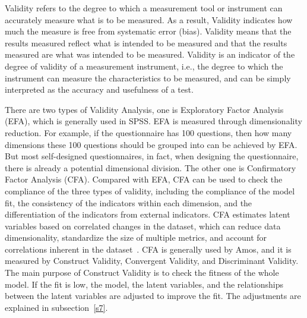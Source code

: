Validity refers to the degree to which a measurement tool or instrument can accurately measure what is to be measured. As a result, Validity indicates how much the measure is free from systematic error (bias). Validity means that the results measured reflect what is intended to be measured and that the results measured are what was intended to be measured. Validity is an indicator of the degree of validity of a measurement instrument, i.e., the degree to which the instrument can measure the characteristics to be measured, and can be simply interpreted as the accuracy and usefulness of a test. 

There are two types of Validity Analysis, one is Exploratory Factor Analysis (EFA), which is generally used in SPSS. EFA is measured through dimensionality reduction. For example, if the questionnaire has 100 questions, then how many dimensions these 100 questions should be grouped into can be achieved by EFA. But most self-designed questionnaires, in fact, when designing the questionnaire, there is already a potential dimensional division. The other one is Confirmatory Factor Analysis (CFA). Compared with EFA, CFA can be used to check the compliance of the three types of validity, including the compliance of the model fit, the consistency of the indicators within each dimension, and the differentiation of the indicators from external indicators. CFA estimates latent variables based on correlated changes in the dataset, which can reduce data dimensionality, standardize the size of multiple metrics, and account for correlations inherent in the dataset~\cite{ref16}. CFA is generally used by Amos, and it is measured by Construct Validity, Convergent Validity, and Discriminant Validity. The main purpose of Construct Validity is to check the fitness of the whole model. If the fit is low, the model, the latent variables, and the relationships between the latent variables are adjusted to improve the fit. The adjustments are explained in subsection~\ref{s7}. 

